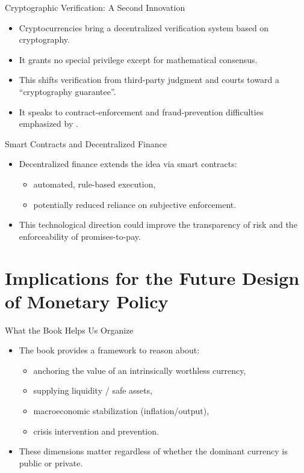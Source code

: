 \documentclass[11pt,aspectratio=169]{beamer}
\begin{document}
\begin{frame}{Cryptographic Verification: A Second Innovation}
\small
\begin{itemize}
  \item Cryptocurrencies bring a decentralized verification system based on cryptography.
  \item It grants no special privilege except for mathematical consensus.
  \item This shifts verification from third-party judgment and courts toward a ``cryptography guarantee''.
  \item It speaks to contract-enforcement and fraud-prevention difficulties emphasized by  \textcite{friedmanschwartz1986}.
\end{itemize}
\end{frame}

\begin{frame}{Smart Contracts and Decentralized Finance}
\small
\begin{itemize}
  \item Decentralized finance extends the idea via smart contracts:
  \begin{itemize}
    \item automated, rule-based execution,
    \item potentially reduced reliance on subjective enforcement.
  \end{itemize}
  \item This technological direction could improve the transparency of risk and the enforceability of promises-to-pay.
\end{itemize}
\end{frame}

\section{Implications for the Future Design of Monetary Policy}

\begin{frame}{What the Book Helps Us Organize}
\small
\begin{itemize}
  \item The book provides a framework to reason about:
  \begin{itemize}
    \item anchoring the value of an intrinsically worthless currency,
    \item supplying liquidity / safe assets,
    \item macroeconomic stabilization (inflation/output),
    \item crisis intervention and prevention.
  \end{itemize}
  \item These dimensions matter regardless of whether the dominant currency is public or private.
\end{itemize}
\end{frame}
\end{document}
